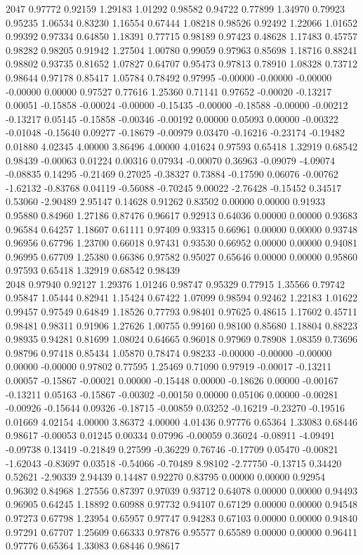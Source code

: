 {2047 0.97772 0.92159 1.29183 1.01292 0.98582 0.94722 0.77899 1.34970 0.79923 0.95235 1.06534 0.83230 1.16554 0.67444 1.08218 0.98526 0.92492 1.22066 1.01652 0.99392 0.97334 0.64850 1.18391 0.77715 0.98189 0.97423 0.48628 1.17483 0.45757 0.98282 0.98205 0.91942 1.27504 1.00780 0.99059 0.97963 0.85698 1.18716 0.88241 0.98802 0.93735 0.81652 1.07827 0.64707 0.95473 0.97813 0.78910 1.08328 0.73712 0.98644 0.97178 0.85417 1.05784 0.78492 0.97995 -0.00000 -0.00000 -0.00000 -0.00000 0.00000 0.97527 0.77616 1.25360 0.71141 0.97652 -0.00020 -0.13217 0.00051 -0.15858 -0.00024 -0.00000 -0.15435 -0.00000 -0.18588 -0.00000 -0.00212 -0.13217 0.05145 -0.15858 -0.00346 -0.00192 0.00000 0.05093 0.00000 -0.00322 -0.01048 -0.15640 0.09277 -0.18679 -0.00979 0.03470 -0.16216 -0.23174 -0.19482 0.01880 4.02345 4.00000 3.86496 4.00000 4.01624 0.97593 0.65418 1.32919 0.68542 0.98439 -0.00063 0.01224 0.00316 0.07934 -0.00070 0.36963 -0.09079 -4.09074 -0.08835 0.14295 -0.21469 0.27025 -0.38327 0.73884 -0.17590 0.06076 -0.00762 -1.62132 -0.83768 0.04119 -0.56088 -0.70245 9.00022 -2.76428 -0.15452 0.34517 0.53060 -2.90489 2.95147 0.14628 0.91262 0.83502 0.00000 0.00000 0.91933 0.95880 0.84960 1.27186 0.87476 0.96617 0.92913 0.64036 0.00000 0.00000 0.93683 0.96584 0.64257 1.18607 0.61111 0.97409 0.93315 0.66961 0.00000 0.00000 0.93748 0.96956 0.67796 1.23700 0.66018 0.97431 0.93530 0.66952 0.00000 0.00000 0.94081 0.96995 0.67709 1.25380 0.66386 0.97582 0.95027 0.65646 0.00000 0.00000 0.95860 0.97593 0.65418 1.32919 0.68542 0.98439 \\
2048 0.97940 0.92127 1.29376 1.01246 0.98747 0.95329 0.77915 1.35566 0.79742 0.95847 1.05444 0.82941 1.15424 0.67422 1.07099 0.98594 0.92462 1.22183 1.01622 0.99457 0.97549 0.64849 1.18526 0.77793 0.98401 0.97625 0.48615 1.17602 0.45711 0.98481 0.98311 0.91906 1.27626 1.00755 0.99160 0.98100 0.85680 1.18804 0.88223 0.98935 0.94281 0.81699 1.08024 0.64665 0.96018 0.97969 0.78908 1.08359 0.73696 0.98796 0.97418 0.85434 1.05870 0.78474 0.98233 -0.00000 -0.00000 -0.00000 0.00000 -0.00000 0.97802 0.77595 1.25469 0.71090 0.97919 -0.00017 -0.13211 0.00057 -0.15867 -0.00021 0.00000 -0.15448 0.00000 -0.18626 0.00000 -0.00167 -0.13211 0.05163 -0.15867 -0.00302 -0.00150 0.00000 0.05106 0.00000 -0.00281 -0.00926 -0.15644 0.09326 -0.18715 -0.00859 0.03252 -0.16219 -0.23270 -0.19516 0.01669 4.02154 4.00000 3.86372 4.00000 4.01436 0.97776 0.65364 1.33083 0.68446 0.98617 -0.00053 0.01245 0.00334 0.07996 -0.00059 0.36024 -0.08911 -4.09491 -0.09738 0.13419 -0.21849 0.27599 -0.36229 0.76746 -0.17709 0.05470 -0.00821 -1.62043 -0.83697 0.03518 -0.54066 -0.70489 8.98102 -2.77750 -0.13715 0.34420 0.52621 -2.90339 2.94439 0.14487 0.92270 0.83795 0.00000 0.00000 0.92954 0.96302 0.84968 1.27556 0.87397 0.97039 0.93712 0.64078 0.00000 0.00000 0.94493 0.96905 0.64245 1.18892 0.60988 0.97732 0.94107 0.67129 0.00000 0.00000 0.94548 0.97273 0.67798 1.23954 0.65957 0.97747 0.94283 0.67103 0.00000 0.00000 0.94840 0.97291 0.67707 1.25609 0.66333 0.97876 0.95577 0.65589 0.00000 0.00000 0.96411 0.97776 0.65364 1.33083 0.68446 0.98617 \\
}
